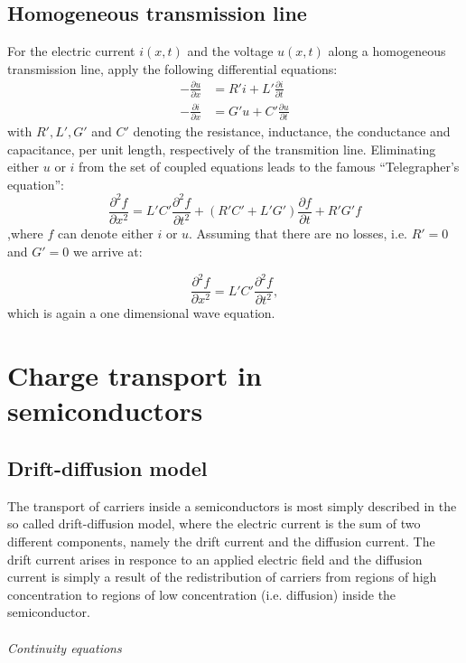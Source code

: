 \documentclass[11pt,a4paper]{report}
\begin{document}
\subsection{Homogeneous transmission line}
For the electric current $i(x,t)$ and the voltage $u(x,t)$ along a homogeneous transmission line, apply the following differential equations:
\begin{align}
  -\frac{\partial u}{\partial x} &= R'i + L' \frac{\partial i}{\partial t} \\
  -\frac{\partial i}{\partial x} &= G' u + C' \frac{\partial u}{\partial t} 
\end{align}
with $R', L' , G' $ and $C'$ denoting the resistance, inductance, the conductance and capacitance, per unit length, respectively of the transmition line. Eliminating either $u$ or $i$ from the set of coupled equations leads to the famous ``Telegrapher's equation'':
\begin{equation}
  \label{eq:telegrapherequation}
\frac{\partial^2 f}{\partial x^2} = L'C'\frac{\partial^2 f}{\partial t^2}+ (R'C'+L'G')\frac{\partial f}{\partial t} + R'G' f
\end{equation}
,where $f$ can denote either $i$ or $u$. Assuming that there are no losses, i.e. $R' = 0 $ and $G' = 0$ we arrive at:

\begin{equation}
\frac{\partial^2 f}{\partial x^2} = L'C'\frac{\partial^2 f}{\partial t^2},
\end{equation}
which is again a one dimensional wave equation. 

\section{Charge transport in semiconductors}
\subsection*{Drift-diffusion model}

The transport of carriers inside a semiconductors is most simply described in the so called drift-diffusion model, where the electric current is the sum of two different components, namely the drift current and the diffusion current. The drift current arises in responce to an applied electric field and the diffusion current is simply a result of the redistribution of carriers from regions of high concentration to regions of low concentration (i.e. diffusion) inside the semiconductor.\\\\
\emph{Continuity equations}\\
\end{document}
